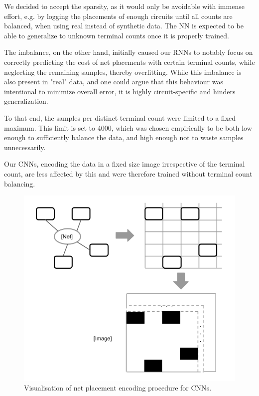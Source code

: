 We decided to accept the sparsity, as it would only be avoidable with immense effort, e.g. by logging the placements of enough circuits until all counts are balanced, when using real instead of synthetic data. The \gls{NN} is expected to be able to generalize to unknown terminal counts once it is properly trained.

The imbalance, on the other hand, initially caused our \glspl{RNN} to notably focus on correctly predicting the cost of net placements with certain terminal counts, while neglecting the remaining samples, thereby overfitting. While this imbalance is also present in "real" data, and one could argue that this behaviour was intentional to minimize overall error, it is highly circuit-specific and hinders generalization.

To that end, the samples per distinct terminal count were limited to a fixed maximum. This limit is set to 4000, which was chosen empirically to be both low enough to sufficiently balance the data, and high enough not to waste samples unnecessarily.

Our \glspl{CNN}, encoding the data in a fixed size image irrespective of the terminal count, are less affected by this and were therefore trained without terminal count balancing.

\begin{figure}[H]
	\includegraphics[width=0.9\linewidth]{plots/cnn-encoding-proper.png}
	\caption{Visualisation of net placement encoding procedure for \glspl{CNN}.}
	\label{fig:cnn-encoding}
\end{figure}

